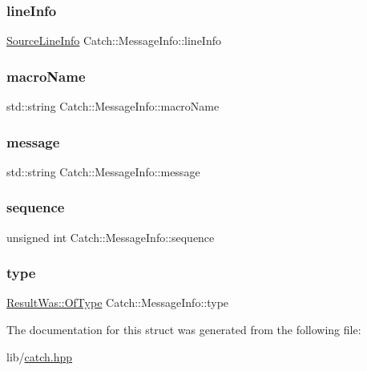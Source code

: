 \subsubsection{\texorpdfstring{line\+Info}{lineInfo}}
{\footnotesize\ttfamily \hyperlink{struct_catch_1_1_source_line_info}{Source\+Line\+Info} Catch\+::\+Message\+Info\+::line\+Info}

\hypertarget{struct_catch_1_1_message_info_a156ade4b3cc731f6ec7b542ae47ba8e3}{}\label{struct_catch_1_1_message_info_a156ade4b3cc731f6ec7b542ae47ba8e3} 
\subsubsection{\texorpdfstring{macro\+Name}{macroName}}
{\footnotesize\ttfamily std\+::string Catch\+::\+Message\+Info\+::macro\+Name}

\hypertarget{struct_catch_1_1_message_info_ab6cd06e050bf426c6577502a5c50e256}{}\label{struct_catch_1_1_message_info_ab6cd06e050bf426c6577502a5c50e256} 
\subsubsection{\texorpdfstring{message}{message}}
{\footnotesize\ttfamily std\+::string Catch\+::\+Message\+Info\+::message}

\hypertarget{struct_catch_1_1_message_info_a7f4f57ea21e50160adefce7b68a781d6}{}\label{struct_catch_1_1_message_info_a7f4f57ea21e50160adefce7b68a781d6} 
\subsubsection{\texorpdfstring{sequence}{sequence}}
{\footnotesize\ttfamily unsigned int Catch\+::\+Message\+Info\+::sequence}

\hypertarget{struct_catch_1_1_message_info_ae928b9117465c696e45951d9d0284e78}{}\label{struct_catch_1_1_message_info_ae928b9117465c696e45951d9d0284e78} 
\subsubsection{\texorpdfstring{type}{type}}
{\footnotesize\ttfamily \hyperlink{struct_catch_1_1_result_was_a624e1ee3661fcf6094ceef1f654601ef}{Result\+Was\+::\+Of\+Type} Catch\+::\+Message\+Info\+::type}



The documentation for this struct was generated from the following file\+:\begin{DoxyCompactItemize}
\item 
lib/\hyperlink{catch_8hpp}{catch.\+hpp}\end{DoxyCompactItemize}

